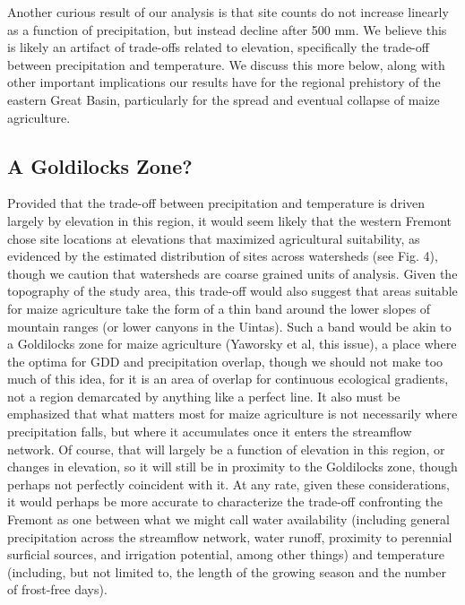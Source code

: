 \documentclass[
  number,
  preprint,
  3p]{elsarticle}
\begin{document}
Another curious result of our analysis is that site counts do not
increase linearly as a function of precipitation, but instead decline
after 500 mm. We believe this is likely an artifact of trade-offs
related to elevation, specifically the trade-off between precipitation
and temperature. We discuss this more below, along with other important
implications our results have for the regional prehistory of the eastern
Great Basin, particularly for the spread and eventual collapse of maize
agriculture.

\hypertarget{a-goldilocks-zone}{%
\subsection{A Goldilocks Zone?}\label{a-goldilocks-zone}}

Provided that the trade-off between precipitation and temperature is
driven largely by elevation in this region, it would seem likely that
the western Fremont chose site locations at elevations that maximized
agricultural suitability, as evidenced by the estimated distribution of
sites across watersheds (see Fig. 4), though we caution that watersheds
are coarse grained units of analysis. Given the topography of the study
area, this trade-off would also suggest that areas suitable for maize
agriculture take the form of a thin band around the lower slopes of
mountain ranges (or lower canyons in the Uintas). Such a band would be
akin to a Goldilocks zone for maize agriculture (Yaworsky et al, this
issue), a place where the optima for GDD and precipitation overlap,
though we should not make too much of this idea, for it is an area of
overlap for continuous ecological gradients, not a region demarcated by
anything like a perfect line. It also must be emphasized that what
matters most for maize agriculture is not necessarily where
precipitation falls, but where it accumulates once it enters the
streamflow network. Of course, that will largely be a function of
elevation in this region, or changes in elevation, so it will still be
in proximity to the Goldilocks zone, though perhaps not perfectly
coincident with it. At any rate, given these considerations, it would
perhaps be more accurate to characterize the trade-off confronting the
Fremont as one between what we might call water availability (including
general precipitation across the streamflow network, water runoff,
proximity to perennial surficial sources, and irrigation potential,
among other things) and temperature (including, but not limited to, the
length of the growing season and the number of frost-free days).
\end{document}
